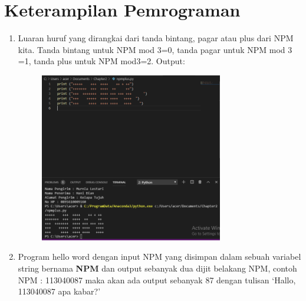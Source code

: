 \documentclass{article}
\begin{document}
\section{Keterampilan Pemrograman}
\begin{enumerate}
\item
Luaran huruf yang dirangkai dari tanda bintang, pagar atau plus dari NPM kita.
Tanda bintang untuk NPM mod 3=0, tanda pagar untuk NPM mod 3 =1, tanda plus untuk NPM mod3=2.
Output:
\begin{figure}[h]
\centerline{\includegraphics[width=8cm]{figure/G.PNG}}
\end{figure}

\newpage\item
Program hello word dengan input NPM yang disimpan dalam sebuah variabel string bernama \textbf{NPM} dan output sebanyak dua dijit belakang NPM, 
contoh NPM : 113040087 maka akan ada output sebanyak 87 dengan tulisan `Hallo, 113040087 apa kabar?'

\end{enumerate}
\end{document}
